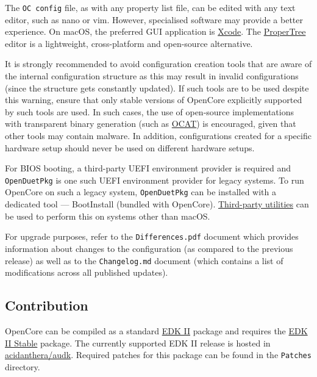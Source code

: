 \documentclass[]{article}
\begin{document}
The \texttt{OC\ config} file, as with any property list file, can be edited with
any text editor, such as nano or vim. However, specialised software
may provide a better experience. On macOS, the preferred GUI application is
\href{https://developer.apple.com/xcode}{Xcode}. The
\href{https://github.com/corpnewt/ProperTree}{ProperTree} editor
is a lightweight, cross-platform and open-source alternative.

It is strongly recommended to avoid configuration creation tools that are aware of the
internal configuration structure as this may result in invalid configurations (since the
structure gets constantly updated). If such tools are to be used despite this warning,
ensure that only stable versions of OpenCore explicitly supported by such tools are used.
In such cases, the use of open-source implementations with transparent binary generation
(such as \href{https://github.com/ic005k/QtOpenCoreConfig}{OCAT}) is encouraged, given
that other tools may contain malware. In addition, configurations created for a specific
hardware setup should never be used on different hardware setups.

For BIOS booting, a third-party UEFI environment provider is required and
\texttt{OpenDuetPkg} is one such UEFI environment provider for legacy systems.
To run OpenCore on such a legacy system, \texttt{OpenDuetPkg} can be installed
with a dedicated tool --- BootInstall (bundled with OpenCore).
\href{https://github.com/corpnewt/gibMacOS}{Third-party utilities} can be used
to perform this on systems other than macOS.

For upgrade purposes, refer to the \texttt{Differences.pdf} document which provides
information about changes to the configuration (as compared to the previous release)
as well as to the \texttt{Changelog.md} document (which contains a list of
modifications across all published updates).

\subsection{Contribution}\label{configuration-comp}

OpenCore can be compiled as a standard
\href{https://github.com/tianocore/tianocore.github.io/wiki/EDK-II}{EDK II}
package and requires the
\href{https://github.com/tianocore/tianocore.github.io/wiki/EDK-II#stable-tags}{EDK II Stable}
package. The currently supported EDK II release is hosted in
\href{https://github.com/acidanthera/audk}{acidanthera/audk}. Required patches
for this package can be found in the \texttt{Patches} directory.
\end{document}
